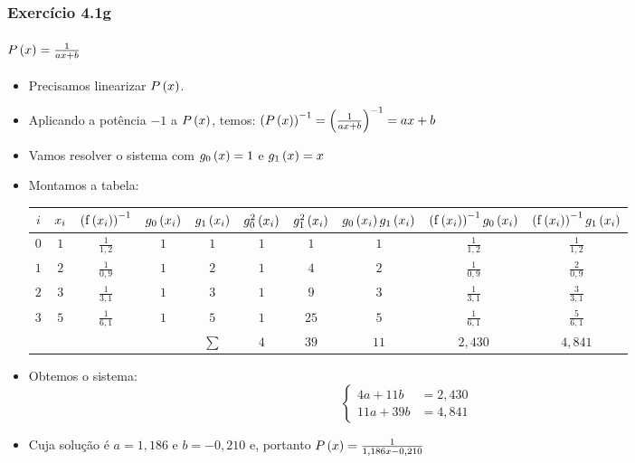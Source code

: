 \begin{frame}
\frametitle{Exercício 4.1g}
\framesubtitle{$P\left(x\right) = \frac{1}{ax + b}$}
\scriptsize

\begin{itemize}[<+->]
  \item Precisamos linearizar $P \left(x \right)$.
  \item Aplicando a potência $-1$ a $P \left(x \right)$, temos: $\left(P\left(x\right)\right)^{-1} = \left(\frac{1}{a x + b}\right)^{-1} = a x + b$
  \item Vamos resolver o sistema com $g_0\left(x\right) = 1$ e $g_1 \left(x\right) = x$
  \item Montamos a tabela:
\begin{tabular}{c|c|c|c|c|c|c|c|c|c}
$i$ & 
  $x_i$ & 
  $\left( \mathrm{f} \left(x_i\right) \right)^{-1}$ &
  $g_0 \left(x_i\right)$ &
  $g_1 \left(x_i\right)$ &
  $g_0^2 \left(x_i\right)$ &
  $g_1^2 \left(x_i\right)$ &
  $g_0 \left(x_i\right) g_1 \left(x_i\right)$ &
  $\left(\mathrm{f} \left(x_i\right) \right)^{-1} g_0 \left(x_i\right)$ &
  $\left(\mathrm{f} \left(x_i\right) \right)^{-1} g_1 \left(x_i\right)$\\
\hline
$0$ & $1$ & $\frac{1}{1,2}$ & $1$ & $1$ & $1$ & $1$  & $1$ & $\frac{1}{1,2}$ & $\frac{1}{1,2}$\\
\hline
$1$ & $2$ & $\frac{1}{0,9}$ & $1$ & $2$ & $1$ & $4$  & $2$ & $\frac{1}{0,9}$ & $\frac{2}{0,9}$\\
\hline
$2$ & $3$ & $\frac{1}{3,1}$ & $1$ & $3$ & $1$ & $9$  & $3$ & $\frac{1}{3,1}$ & $\frac{3}{3,1}$\\
\hline
$3$ & $5$ & $\frac{1}{6,1}$ & $1$ & $5$ & $1$ & $25$ & $5$ & $\frac{1}{6,1}$ & $\frac{5}{6,1}$\\
\hline
& & & & $\sum$ & $4$ & $39$ & $11$ & $2,430$ & $4,841$  
\end{tabular}
  \item Obtemos o sistema:
\[
\begin{cases}
4 a + 11 b &= 2,430\\
%
11 a + 39 b &= 4,841
\end{cases}
\]
  \item Cuja solução é $a = 1,186$ e $b = -0,210$ e, portanto $P\left(x\right) = \frac{1}{1,186 x -0,210}$
\end{itemize}

\end{frame}


